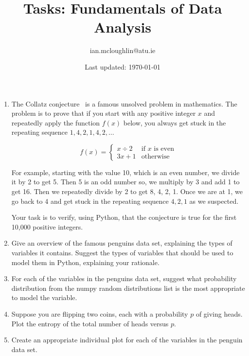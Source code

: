 \documentclass{iansnotes}
\title{Tasks: Fundamentals of Data Analysis}
\author{ian.mcloughlin@atu.ie}
\date{Last updated: \today}
\begin{document}
 
\maketitle
 
\begin{enumerate}
  
  

  \item The Collatz conjecture~\autocite{quantacollatz} is a famous unsolved problem in mathematics. The problem is to prove that if you start with any positive integer $x$ and repeatedly apply the function $f(x)$ below, you always get stuck in the repeating sequence $1,4,2,1,4,2,\ldots$ 
  
  $$ f(x) = \begin{cases}
    x \div 2 & \text{if } x \text{ is even} \\
    3x + 1              & \text{otherwise} 
  \end{cases}$$

  For example, starting with the value 10, which is an even number, we divide it by 2 to get 5.
  Then 5 is an odd number so, we multiply by 3 and add 1 to get 16.
  Then we repeatedly divide by 2 to get 8, 4, 2, 1.
  Once we are at 1, we go back to 4 and get stuck in the repeating sequence $4, 2, 1$ as we suspected.

  Your task is to verify, using Python, that the conjecture is true for the first 10,000 positive integers.
  
  \item Give an overview of the famous penguins data set\autocite{penguinscsv}, explaining the types of variables it contains. Suggest the types of variables that should be used to model them in Python, explaining your rationale.

  \item For each of the variables in the penguins data set\autocite{penguinscsv}, suggest what probability distribution from the numpy random distributions list is the most appropriate to model the variable\autocite{numpyrandomdistributions}.

  \item Suppose you are flipping two coins, each with a probability $p$ of giving heads. Plot the entropy of the total number of heads versus $p$.

  \item Create an appropriate individual plot for each of the variables in the penguin data set\autocite{penguinscsv}.

\end{enumerate}
\end{document}
